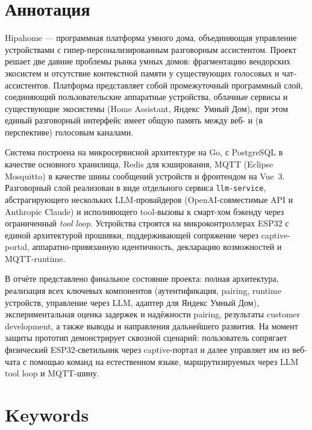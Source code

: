 \documentclass[a4paper,12pt]{article}
\newcommand{\eng}[1]{\textit{#1}}
\begin{document}
\section*{Аннотация}

Hipahome --- программная платформа умного дома, объединяющая управление устройствами с гипер-персонализированным разговорным ассистентом. Проект решает две давние проблемы рынка умных домов: фрагментацию вендорских экосистем и отсутствие контекстной памяти у существующих голосовых и чат-ассистентов. Платформа представляет собой промежуточный программный слой, соединяющий пользовательские аппаратные устройства, облачные сервисы и существующие экосистемы (Home Assistant, Яндекс~Умный Дом), при этом единый разговорный интерфейс имеет общую память между веб- и (в перспективе) голосовым каналами.

Система построена на микросервисной архитектуре на Go, с PostgreSQL в качестве основного хранилища, Redis для кэширования, MQTT (Eclipse Mosquitto) в качестве шины сообщений устройств и фронтендом на Vue~3. Разговорный слой реализован в виде отдельного сервиса \verb|llm-service|, абстрагирующего нескольких LLM-провайдеров (OpenAI-совместимые API и Anthropic Claude) и исполняющего tool-вызовы к смарт-хом бэкенду через ограниченный \eng{tool loop}. Устройства строятся на микроконтроллерах ESP32 с единой архитектурой прошивки, поддерживающей сопряжение через captive-portal, аппаратно-привязанную идентичность, декларацию возможностей и MQTT-runtime.

В отчёте представлено финальное состояние проекта: полная архитектура, реализация всех ключевых компонентов (аутентификация, pairing, runtime устройств, управление через LLM, адаптер для Яндекс Умный Дом), экспериментальная оценка задержек и надёжности pairing, результаты customer development, а также выводы и направления дальнейшего развития. На момент защиты прототип демонстрирует сквозной сценарий: пользователь сопрягает физический ESP32-светильник через captive-портал и далее управляет им из веб-чата с помощью команд на естественном языке, маршрутизируемых через LLM tool loop и MQTT-шину.

\newpage

\section*{Keywords}
\end{document}
